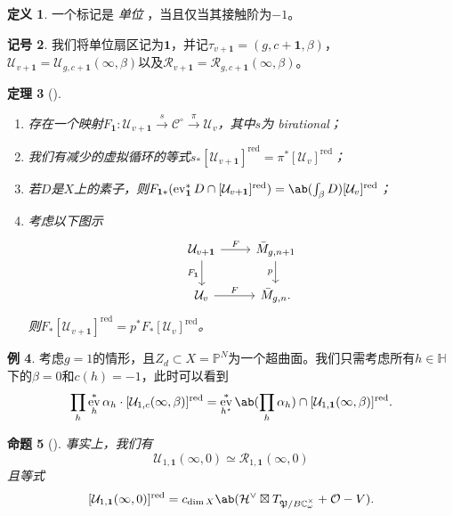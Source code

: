 \documentclass{amsart}
\newtheorem{thm}{定理}[section]
\newtheorem{prop}[thm]{命题}
\theoremstyle{definition}
\newtheorem{defn}[thm]{定义}
\newtheorem{exm}[thm]{例}
\newtheorem{notn}[thm]{记号}
\theoremstyle{remark}
\theoremstyle{plain}
\theoremstyle{definition}
\theoremstyle{remark}
\newcommand{\C}{\mathbb{C}}
\renewcommand{\H}{\mathbb{H}}
\renewcommand{\P}{\mathbb{P}}
\newcommand{\mc}[1]{\mathcal{#1}}
\newcommand{\mf}[1]{\mathfrak{#1}}
\newcommand{\mr}[1]{\mathrm{#1}}
\newcommand{\on}[1]{\operatorname{#1}}
\newcommand{\1}{\mathbf{1}}
\newcommand{\2}{\mathbf{2}}
\newcommand{\3}{\mathbf{3}}
\DeclareMathOperator{\ev}{ev}
\begin{document}
\begin{defn}
一个标记是 \textit{ 单位 }，当且仅当其接触阶为\(-1\)。
\end{defn}

\begin{notn}
我们将单位扇区记为\(\1\)，并记\(\tau_{v+\1} = (g, c+\1, \beta)\)，\(\mc{U}_{v+\1} = \mc{U}_{g, c+\1}(\infty, \beta)\)以及\(\mc{R}_{v+\1} = \mc{R}_{g, c+\1}(\infty, \beta)\)。
\end{notn}

\begin{thm}[{\cite[定理~1.16--1.17]{CJRpunctured}}]\leavevmode
    \begin{enumerate}
\item 存在一个映射\(F_{\1} \colon \mc{U}_{v+\1} \xrightarrow{s} \mc{C}^{\circ} \xrightarrow{\pi} \mc{U}_v\)，其中\(s\)为 birational；
\item 我们有减少的虚拟循环的等式\(s_* [\mc{U}_{v+\1}]^{\on{red}} = \pi^* [\mc{U}_v]^{\on{red}}\)；
\item 若\(D\)是\(X\)上的素子，则\(F_{\1 *} (\ev_{\1}^* D \cap [\mc{U}_{v+\1}]^{\on{red}}) = \ab(\int_{\beta} D) [\mc{U}_v]^{\on{red}}\)；
\item 考虑以下图示
            \begin{equation*}
            \begin{tikzcd}
                \mc{U}_{v+\1} \ar{r}{F} \ar{d}[swap]{F_{\1}} & \bar{M}_{g,n+1} \ar{d}[swap]{p} \\
                \mc{U}_v \ar{r}{F} & \bar{M}_{g,n}.
            \end{tikzcd}
            \end{equation*}
则\(F_* [\mc{U}_{v+\1}]^{\on{red}} = p^* F_* [\mc{U}_v]^{\on{red}}\)。
    \end{enumerate}
\end{thm}

\begin{exm}
    考虑\(g = 1\)的情形，且\(Z_d \subset X = \P^N\)为一个超曲面。我们只需考虑所有\(h \in \H\)下的\(\beta = 0\)和\(c(h) = -1\)，此时可以看到
    \[ \prod_h \ev_h^* \alpha_h \cdot [\mc{U}_{1,c}(\infty,\beta)]^{\mr{red}} = \ev_{h^{\star}}^* \ab(\prod_h \alpha_h) \cap [\mc{U}_{1,\1}(\infty,\beta)]^{\on{red}}. \]
\end{exm}

\begin{prop}[{\cite{CJRpunctured}}]
事实上，我们有
    \[ \mc{U}_{1,\1}(\infty, 0) \simeq \mc{R}_{1,\1}(\infty, 0) \]
且等式
    \[ [\mc{U}_{1,\1}(\infty, 0)]^{\on{red}} = c_{\dim X} \ab(\mc{H}^{\vee} \boxtimes T_{\mf{P}/B\C_{\omega}^{\times}} + \mc{O} - V). \]
\end{prop}
\end{document}
